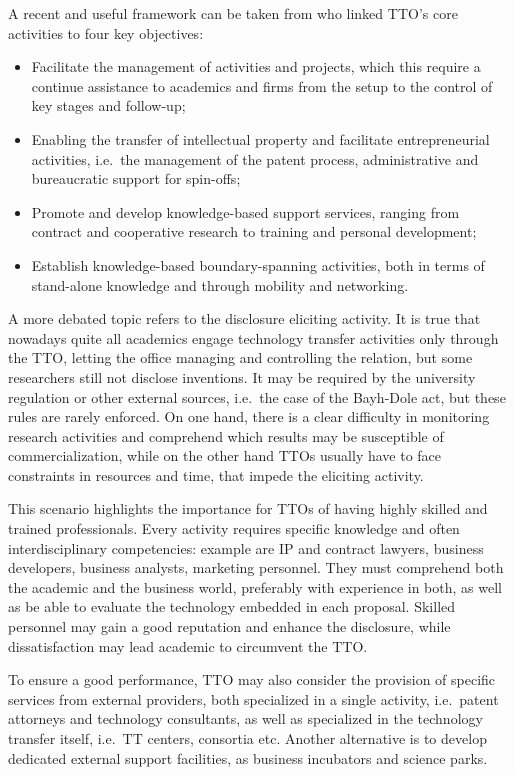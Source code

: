 A recent and useful framework can be taken from \citet{Alexander2013} who linked TTO's core activities to four key objectives: 
\begin{itemize}
\item Facilitate the management of activities and projects, which this require a continue assistance to academics and firms from the setup to the control of key stages and follow-up;
\item Enabling the transfer of intellectual property and facilitate entrepreneurial activities, i.e.\ the management of the patent process, administrative and bureaucratic support for spin-offs;
\item Promote and develop knowledge-based support services, ranging from contract and cooperative research to training and personal development;
\item Establish knowledge-based boundary-spanning activities, both in terms of stand-alone knowledge and through mobility and networking. 
\end{itemize}

A more debated topic refers to the disclosure eliciting activity. It is true that nowadays quite all academics engage technology transfer activities only through the TTO, letting the office managing and controlling the relation, but some researchers still not disclose inventions. It may be required by the university regulation or other external sources, i.e.\ the case of the Bayh-Dole act, but these rules are rarely enforced. On one hand, there is a clear difficulty in monitoring research activities and comprehend which results may be susceptible of commercialization, while on the other hand TTOs usually have to face constraints in resources and time, that impede the eliciting activity. 

This scenario highlights the importance for TTOs of having highly skilled and trained professionals. Every activity requires specific knowledge and often interdisciplinary competencies: example are IP and contract lawyers, business developers, business analysts, marketing personnel. They must comprehend both the academic and the business world, preferably with experience in both, as well as be able to evaluate the technology embedded in each proposal. Skilled personnel may gain a good reputation and enhance the disclosure, while dissatisfaction may lead academic to circumvent the TTO. 

To ensure a good performance, TTO may also consider the provision of specific services from external providers, both specialized in a single activity, i.e.\ patent attorneys and technology consultants, as well as specialized in the technology transfer itself, i.e.\ TT centers, consortia etc. Another alternative is to develop dedicated external support facilities, as business incubators and science parks.

